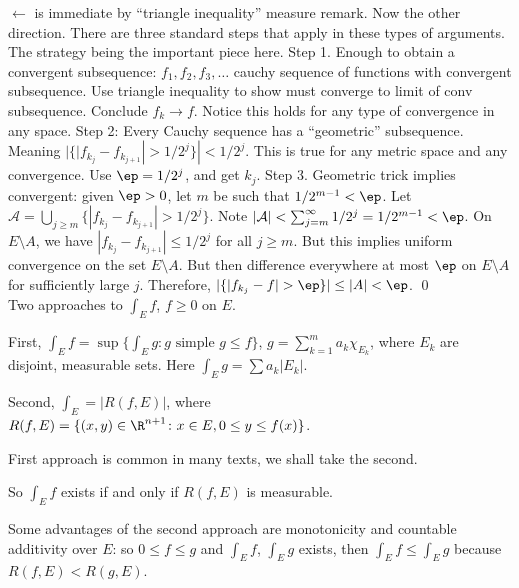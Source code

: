 \pfsk $\leftarrow$ is immediate by ``triangle inequality'' measure remark. Now the other direction. There are three standard steps that apply in these types of arguments. The strategy being the important piece here. Step 1. Enough to obtain a convergent subsequence: $f_1,f_2,f_3,\ldots$ cauchy sequence of functions with convergent subsequence. Use triangle inequality to show must converge to limit of conv subsequence. Conclude $f_k \to f$. Notice this holds for any type of convergence in any space. Step 2: Every Cauchy sequence has a ``geometric'' subsequence. Meaning $|\{ |f_{k_j} - f_{k_{j+1}}|>1/2^j\}|<1/2^j$. This is true for any metric space and any convergence. Use $\ep=1/2^j$, and get $k_j$. Step 3. Geometric trick implies convergent: given $\ep>0$, let $m$ be such that $1/2^{m-1}<\ep$. Let $\mathcal{A}= \bigcup_{j \geq m} \{ |f_{k_j} - f_{k_{j+1}}|>1/2^j\}$. Note $|\mathcal{A}|< \sum_{j=m}^\infty 1/2^j = 1/2^{m-1}<\ep$. On $E \setminus A$, we have $|f_{k_j} - f_{k_{j+1}}| \leq 1/2^j$ for all $j \geq m$. But this implies uniform convergence on the set $E \setminus A$. But then difference everywhere at most $\ep$ on $E \setminus A$ for sufficiently large $j$. Therefore, $|\{ |f_{k_j} - f|>\ep\}| \leq |A|<\ep$. \qed \\ 









Two approaches to $\int_E f$, $f \geq 0$ on $E$.

First, $\int_E f= \sup \{ \int_E g \colon g \text{ simple } g \leq f\}$, $g = \sum_{k=1}^m a_k \chi_{E_k}$, where $E_k$ are disjoint, measurable sets. Here $\int_E g = \sum a_k |E_k|$.

Second, $\int_E = |R(f,E)|$, where $R(f,E)= \{ (x,y) \in \R^{n+1} \colon x \in E, 0 \leq y \leq f(x)\}$. 

First approach is common in many texts, we shall take the second. 

So $\int_E f$ exists if and only if $R(f,E)$ is measurable. 



Some advantages of the second approach are monotonicity and countable additivity over $E$: so $0 \leq f \leq g$ and $\int_E f$, $\int_E g$ exists, then $\int_E f \leq \int_E g$ because $R(f,E) < R(g,E)$. 


